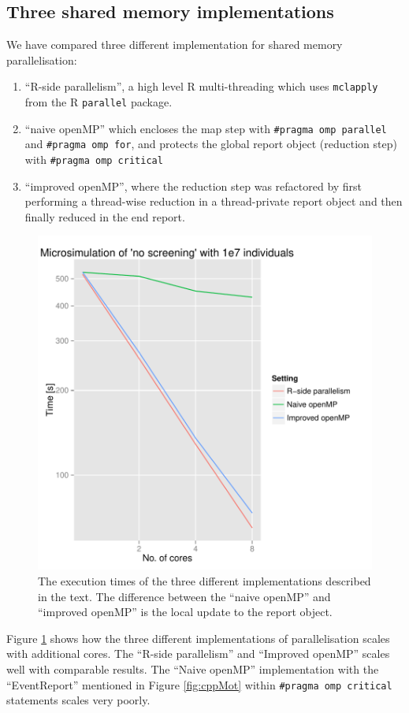\subsection{Three shared memory implementations}

We have compared three different implementation for shared memory parallelisation: 
\begin{enumerate}
\item ``R-side parallelism'', a high level R multi-threading which uses
  \texttt{mclapply} from the R \texttt{parallel} package.
\item ``naive openMP'' which encloses the map step with \texttt{\#pragma
    omp parallel} and \texttt{\#pragma omp for}, and protects the
  global report object (reduction step) with \texttt{\#pragma omp
    critical}
\item ``improved openMP'', where the reduction step was refactored by
  first performing a thread-wise reduction in a thread-private report
  object and then finally reduced in the end report.
\end{enumerate}
\begin{figure}[!htbp] \centering
  \includegraphics[height=0.5\textheight]{images/implementationProfiling.pdf}
  \caption{The execution times of the three different implementations
    described in the text. The difference between the ``naive openMP''
  and ``improved openMP'' is the local update to the report
  object.}
  \label{fig:implScaling}
\end{figure} 
Figure \ref{fig:implScaling} shows how the three
different implementations of parallelisation scales with additional
cores. The ``R-side parallelism'' and ``Improved openMP'' scales
well with comparable results. The ``Naive openMP'' implementation
with the ``EventReport'' mentioned in Figure \ref{fig:cppMot} within
\texttt{\#pragma omp critical} statements scales very poorly. 

